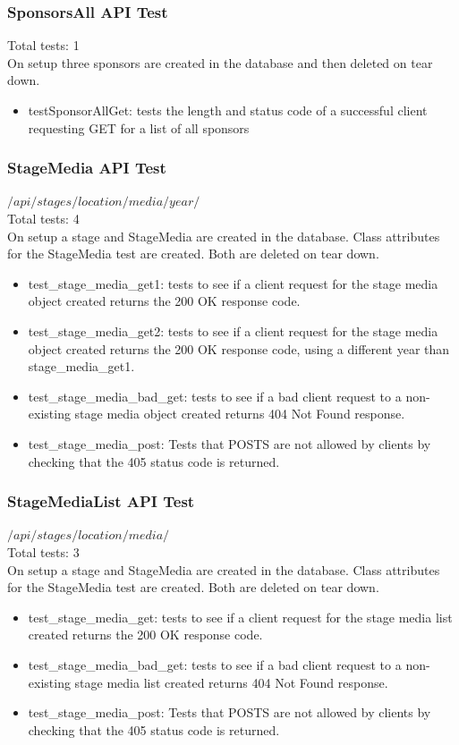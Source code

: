 \documentclass[12pt,english]{scrartcl}
\begin{document}
 \subsubsection{SponsorsAll API Test}
 Total tests: 1\\
 On setup three sponsors are created in the database and then deleted on tear down.
 \begin{itemize}
 
 \item testSponsorAllGet: tests the length and status code of a successful client requesting GET for a list of all 
 sponsors
 
 \end{itemize}

\subsubsection{StageMedia API Test}
$/api/stages/{location}/media/{year}/$ \\
Total tests: 4 \\
On setup a stage and StageMedia are created in the database. Class attributes for the StageMedia test are created.
Both are deleted on tear down.
\begin{itemize}
\item test\_stage\_media\_get1: tests to see if a client request for the stage media object created returns the 200 OK response code.
\item test\_stage\_media\_get2: tests to see if a client request for the stage media object created returns the 200 OK response code, using a different year than stage\_media\_get1.
\item test\_stage\_media\_bad\_get: tests to see if a bad client request to a non-existing stage media object created returns
404 Not Found response.
\item test\_stage\_media\_post: Tests that POSTS are not allowed by clients by checking that the 405 status code is returned.
\end{itemize}

\subsubsection{StageMediaList API Test}
$/api/stages/{location}/media/$ \\
Total tests: 3 \\
On setup a stage and StageMedia are created in the database. Class attributes for the StageMedia test are created.
Both are deleted on tear down.
\begin{itemize}
\item test\_stage\_media\_get: tests to see if a client request for the stage media list created returns the 200 OK response code.
\item test\_stage\_media\_bad\_get: tests to see if a bad client request to a non-existing stage media list created returns
404 Not Found response.
\item test\_stage\_media\_post: Tests that POSTS are not allowed by clients by checking that the 405 status code is returned.
\end{itemize}
\end{document}
